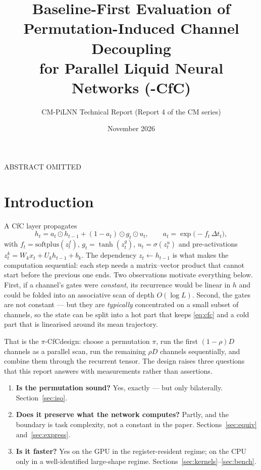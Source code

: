\documentclass[11pt]{article}
\title{\textbf{Baseline-First Evaluation of Permutation-Induced Channel Decoupling\\
for Parallel Liquid Neural Networks (\pi-CfC)}}
\author{CM-PiLNN Technical Report \textnormal{(Report 4 of the CM series)}}
\date{November 2026}
\theoremstyle{definition}
\newcommand{\piCfC}{\ensuremath{\pi}-CfC}
\begin{document}
\maketitle

ABSTRACT OMITTED

\section{Introduction}

A CfC layer propagates
\begin{equation}
h_t = a_t \odot h_{t-1} + (1-a_t)\odot g_t \odot u_t,
\qquad a_t = \exp\!\big(-f_t\,\Delta t_t\big),
\label{eq:cfc}
\end{equation}
with $f_t=\mathrm{softplus}(z^f_t)$, $g_t=\tanh(z^g_t)$, $u_t=\sigma(z^u_t)$ and pre-activations
$z^{k}_t = W_k x_t + U_k h_{t-1} + b_k$. The dependency $z_t \leftarrow h_{t-1}$ is what makes the
computation sequential: each step needs a matrix--vector product that cannot start before the previous one
ends. Two observations motivate everything below. First, if a channel's gates were \emph{constant}, its
recurrence would be linear in $h$ and could be folded into an associative scan of depth
$O(\log L)$. Second, the gates are not constant --- but they are \emph{typically} concentrated on a small
subset of channels, so the state can be split into a hot part that keeps \eqref{eq:cfc} and a cold part that
is linearised around its mean trajectory.

That is the \piCfC design: choose a permutation $\pi$, run the first $(1-\rho)D$ channels as a parallel scan,
run the remaining $\rho D$ channels sequentially, and combine them through the recurrent tensor. The design
raises three questions that this report answers with measurements rather than assertions.

\begin{enumerate}[leftmargin=1.4em]
\item \textbf{Is the permutation sound?} Yes, exactly --- but only bilaterally. Section~\ref{sec:iso}.
\item \textbf{Does it preserve what the network computes?} Partly, and the boundary is task complexity, not
      a constant in the paper. Sections~\ref{sec:equiv} and~\ref{sec:express}.
\item \textbf{Is it faster?} Yes on the GPU in the register-resident regime; on the CPU only in a
      well-identified large-shape regime. Sections~\ref{sec:kernels}--\ref{sec:bench}.
\end{enumerate}
\end{document}
